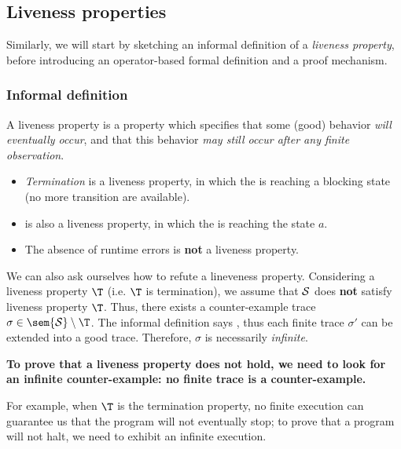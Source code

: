 \documentclass[toc, titlepaged]{../cs-classes/cs-classes}
\begin{document}
\subsection{Liveness properties}
Similarly, we will start by sketching an informal definition of a \emph{liveness property}, before introducing an operator-based formal definition and a proof mechanism.

\subsubsection{Informal definition}
\begin{definition}
    A liveness property is a property which specifies that some (good) behavior \emph{will eventually occur}, and that this behavior \emph{may still occur after any finite observation}.
\end{definition}

\begin{itemize}
    \item \emph{Termination} is a liveness property, in which the  is reaching a blocking state (no more transition are available).
    \item {} is also a liveness property, in which the  is reaching the state $a$.
    \item The absence of runtime errors is \textbf{not} a liveness property.
\end{itemize}

We can also ask ourselves how to refute a lineveness property. Considering a liveness property $\T$ (i.e. $\T$ is termination), we assume that $\mathcal{S}$ does \textbf{not} satisfy liveness property $\T$. Thus, there exists a counter-example trace $\sigma\in\sem{\Sc}\setminus\T$. The informal definition says , thus each finite trace $\sigma'$ can be extended into a good trace. Therefore, $\sigma$ is necessarily \emph{infinite}.
\begin{center}
    \bf To prove that a liveness property does not hold, we need to look for an infinite counter-example: no finite trace is a counter-example.
\end{center}
For example, when $\T$ is the termination property, no finite execution can guarantee us that the program will not eventually stop; to prove that a program will not halt, we need to exhibit an infinite execution.
\end{document}

